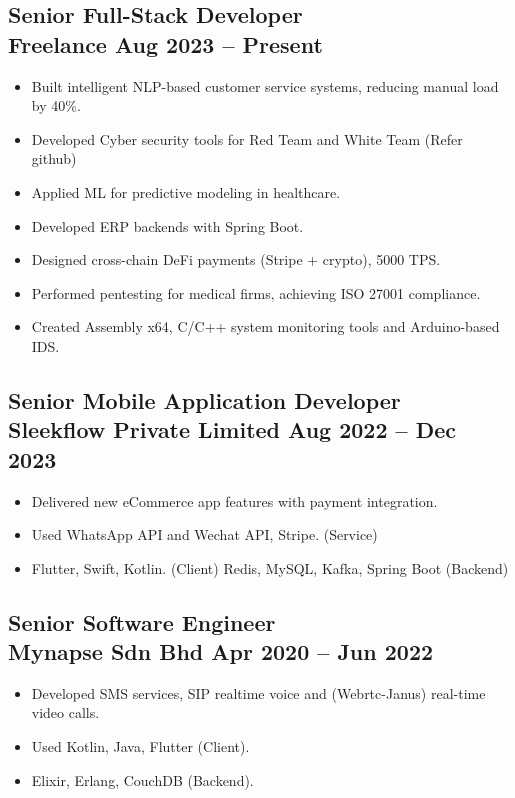 \documentclass[11pt,a4paper]{article}
\begin{document}
\subsection*{Senior Full-Stack Developer \\ \normalfont Freelance \hfill Aug 2023 -- Present}
\begin{itemize}[leftmargin=1.5em]
    \item Built intelligent NLP-based customer service systems, reducing manual load by 40\%.
    \item Developed Cyber security tools for Red Team and White Team (Refer github)
    \item Applied ML for predictive modeling in healthcare.
    \item Developed ERP backends with Spring Boot.
    \item Designed cross-chain DeFi payments (Stripe + crypto), 5000 TPS.
    \item Performed pentesting for medical firms, achieving ISO 27001 compliance.
    \item Created Assembly x64, C/C++ system monitoring tools and Arduino-based IDS.
\end{itemize}

\subsection*{Senior Mobile Application Developer \\ \normalfont Sleekflow Private Limited \hfill Aug 2022 -- Dec 2023}
\begin{itemize}[leftmargin=1.5em]
    \item Delivered new eCommerce app features with payment integration.
    \item Used WhatsApp API and Wechat API, Stripe. (Service)
    \item Flutter, Swift, Kotlin. (Client)
    \itme Redis, MySQL, Kafka, Spring Boot (Backend)
\end{itemize}

\subsection*{Senior Software Engineer \\ \normalfont Mynapse Sdn Bhd \hfill Apr 2020 -- Jun 2022}
\begin{itemize}[leftmargin=1.5em]
    \item Developed SMS services, SIP realtime voice and (Webrtc-Janus) real-time video calls.
    \item Used Kotlin, Java, Flutter (Client).
    \item Elixir, Erlang, CouchDB (Backend).
\end{itemize}
\end{document}
